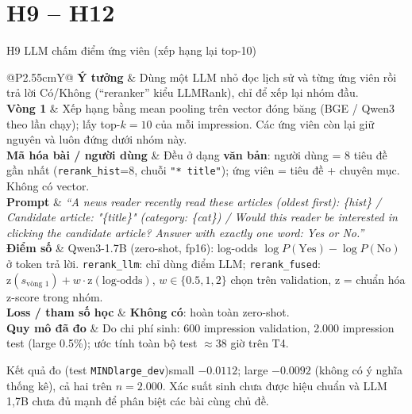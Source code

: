 \documentclass[aspectratio=169,t]{beamer}
\makeatletter
\newcommand{\code}[1]{\texttt{#1}}
\newcommand{\bangmota}[1]{{\scriptsize\renewcommand{\arraystretch}{1.1}\setlength{\tabcolsep}{4pt}%
  \begin{tabularx}{\textwidth}{@{}P{2.55cm}Y@{}}\toprule #1 \bottomrule\end{tabularx}}}
\newcommand{\rw}[2]{\textbf{#1} & #2\\ \midrule}
\newcommand{\rwl}[2]{\textbf{#1} & #2\\}
\newcommand{\ketqua}[1]{\begin{exampleblock}{Kết quả đo (test \code{MINDlarge\_dev})}\scriptsize #1\end{exampleblock}}
\makeatother
\begin{document}
\section{H9 -- H12}
\begin{frame}[shrink]{H9 \textperiodcentered{} LLM chấm điểm ứng viên (xếp hạng lại top-10)}
\bangmota{
\rw{Ý tưởng}{Dùng một LLM nhỏ đọc lịch sử và từng ứng viên rồi trả lời Có/Không (``reranker'' kiểu LLMRank), chỉ để xếp lại nhóm đầu.}
\rw{Vòng 1}{Xếp hạng bằng mean pooling trên vector đóng băng (BGE / Qwen3 theo lần chạy); lấy top-$k=10$ của mỗi impression. Các ứng viên còn lại giữ nguyên và luôn đứng dưới nhóm này.}
\rw{Mã hóa bài / người dùng}{Đều ở dạng \textbf{văn bản}: người dùng = 8 tiêu đề gần nhất (\code{rerank\_hist}=8, chuỗi \code{"* title"}); ứng viên = tiêu đề + chuyên mục. Không có vector.}
\rw{Prompt}{\textit{``A news reader recently read these articles (oldest first): \{hist\} / Candidate article: "\{title\}" (category: \{cat\}) / Would this reader be interested in clicking the candidate article? Answer with exactly one word: Yes or No.''}}
\rw{Điểm số}{Qwen3-1.7B (zero-shot, fp16): log-odds $\log P(\text{Yes})-\log P(\text{No})$ ở token trả lời. \code{rerank\_llm}: chỉ dùng điểm LLM; \code{rerank\_fused}: $\mathrm{z}(s_{\text{vòng 1}})+w\cdot\mathrm{z}(\text{log-odds})$, $w\in\{0.5,1,2\}$ chọn trên validation, $\mathrm z$ = chuẩn hóa z-score trong nhóm.}
\rw{Loss / tham số học}{\textbf{Không có}: hoàn toàn zero-shot.}
\rwl{Quy mô đã đo}{Do chi phí sinh: 600 impression validation, 2.000 impression test (large 0.5\%); ước tính toàn bộ test $\approx$38 giờ trên T4.}
}
\ketqua{small $-0.0112$; large $-0.0092$ (không có ý nghĩa thống kê), cả hai trên $n=2.000$. Xác suất sinh chưa được hiệu chuẩn và LLM 1,7B chưa đủ mạnh để phân biệt các bài cùng chủ đề.}
\par\kern0pt
\end{frame}
\end{document}
